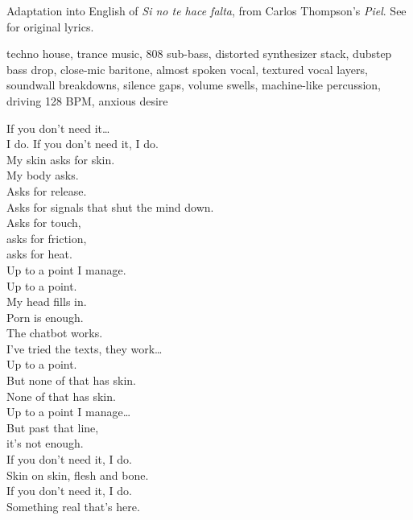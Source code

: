 
\begin{notes}
Adaptation into English of \emph{Si no te hace falta}, from Carlos Thompson's \emph{Piel}. See \pageref{sec:piel} for original lyrics.
\end{notes}
\begin{style}
techno house, trance music, 808 sub-bass, distorted synthesizer stack, dubstep bass drop, close-mic baritone, almost spoken vocal, textured vocal layers, soundwall breakdowns, silence gaps, volume swells, machine-like percussion, driving 128 BPM, anxious desire
\end{style}
\begin{lyrics}
If you don’t need it…\\
I do.
If you don’t need it, I do.\\
My skin asks for skin.\\
My body asks.\\
Asks for release.\\
Asks for signals that shut the mind down.\\
Asks for touch,\\
asks for friction,\\
asks for heat.\\
Up to a point I manage.\\
Up to a point.\\
My head fills in.\\
Porn is enough.\\
The chatbot works.\\
I’ve tried the texts, they work…\\
Up to a point.
\\
But none of that has skin.\\
None of that has skin.\\
Up to a point I manage…\\
But past that line,\\
it’s not enough.
\\
If you don’t need it, I do.\\
Skin on skin, flesh and bone.\\
If you don’t need it, I do.\\
Something real that’s here.

\end{lyrics}
